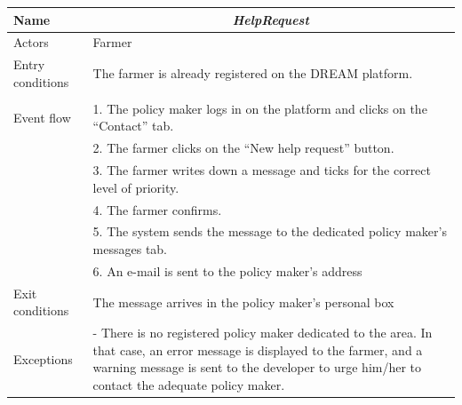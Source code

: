 \begin{table}[htbp]
	\centering
	\begin{tabularx}{\linewidth}{|l|X|}
		\hline
		Name & \multicolumn{1}{c|}{\textit{\textbf{HelpRequest}}}                                                   \tabularnewline \hline
		Actors                                               & Farmer                                               \tabularnewline \hline
		Entry conditions                                              &
		The farmer is already registered on the DREAM platform.
		\tabularnewline
		&
		\tabularnewline \hline
		Event flow                                         & 1.	The policy maker logs in on the platform and clicks on the “Contact” tab.                                        \tabularnewline 
		& 2.	The farmer clicks on the “New help request” button.                                   \tabularnewline 
		& 3.	The farmer writes down a message and ticks for the correct level of priority.                                           \tabularnewline 
		& 4.	The farmer confirms.                                   \tabularnewline
		& 5.	The system sends the message to the dedicated policy maker’s messages tab.                                          \tabularnewline
		& 6.	An e-mail is sent to the policy maker’s address                                    \tabularnewline
		\hline
		Exit conditions 
		& The message arrives in the policy maker’s personal box
		\tabularnewline \hline
		Exceptions 
		& 
		-	There is no registered policy maker dedicated to the area. In that case, an error message is displayed to the farmer, and a warning message is sent to the developer to urge him/her to contact the adequate policy maker.
		\tabularnewline
		\hline
	\end{tabularx}   
\end{table}

